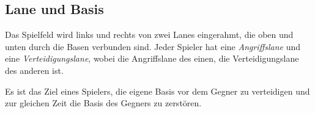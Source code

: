 \subsection{Lane und Basis}

Das Spielfeld wird links und rechts von zwei Lanes eingerahmt, die oben und
unten durch die Basen verbunden sind. Jeder Spieler hat eine
\emph{Angriffslane} und eine \emph{Verteidigungslane}, wobei die Angriffslane
des einen, die Verteidigungslane des anderen ist.

Es ist das Ziel eines Spielers, die eigene Basis vor dem Gegner zu verteidigen
und zur gleichen Zeit die Basis des Gegners zu zerstören.
